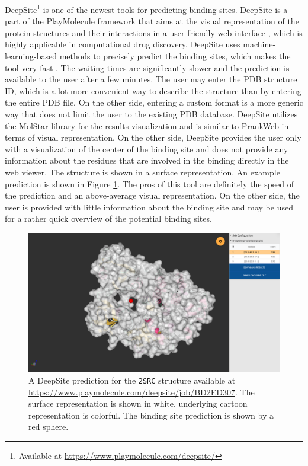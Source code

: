 DeepSite\footnote{Available at \url{https://www.playmolecule.com/deepsite/}} is one of the newest tools for predicting binding sites. DeepSite is a part of the PlayMolecule framework that aims at the visual representation of the protein structures and their interactions in a user-friendly web interface \cite{martinez2017playmolecule} \cite{10.1093/bioinformatics/bty758}, which is highly applicable in computational drug discovery. DeepSite uses machine-learning-based methods to precisely predict the binding sites, which makes the tool very fast \cite{10.1093/bioinformatics/btx350}. The waiting times are significantly slower and the prediction is available to the user after a few minutes. The user may enter the PDB structure ID, which is a lot more convenient way to describe the structure than by entering the entire PDB file. On the other side, entering a custom format is a more generic way that does not limit the user to the existing PDB database. DeepSite utilizes the MolStar library for the results visualization and is similar to PrankWeb in terms of visual representation. On the other side, DeepSite provides the user only with a visualization of the center of the binding site and does not provide any information about the residues that are involved in the binding directly in the web viewer. The structure is shown in a surface representation. An example prediction is shown in Figure \ref{fig:deepsite_prediction}. The pros of this tool are definitely the speed of the prediction and an above-average visual representation. On the other side, the user is provided with little information about the binding site and may be used for a rather quick overview of the potential binding sites.

\begin{figure}
    \centering
    \includegraphics[width=\linewidth]{img/deepsite_prediction.png}
    \caption{A DeepSite prediction for the \texttt{2SRC} structure available at \url{https://www.playmolecule.com/deepsite/job/BD2ED307}. The surface representation is shown in white, underlying cartoon representation is colorful. The binding site prediction is shown by a red sphere.}
    \label{fig:deepsite_prediction}
\end{figure}